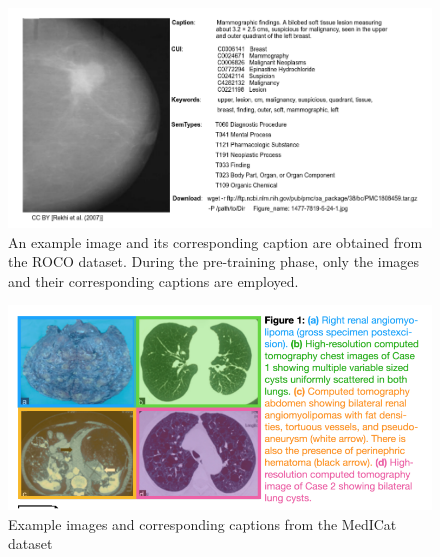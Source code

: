 \begin{figure}[t]
\begin{center}
\includegraphics[width=1.0\linewidth]{Chapter_3/chap3_ROCO2.png}
\end{center}
   \caption{An example image and its corresponding caption are obtained from the ROCO dataset. During the pre-training phase, only the images and their corresponding captions are employed.
}
\label{fig:roco2}
\end{figure}

\begin{figure}[t]
\begin{center}
\includegraphics[width=1.0\linewidth]{Chapter_3/chap3_medicat.png}
\end{center}
   \caption{Example images and corresponding captions from the MedICat dataset
}
\label{fig:medicat}
\end{figure}

